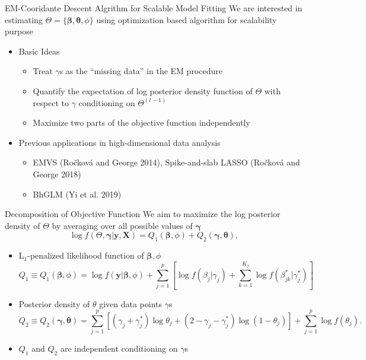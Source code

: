 \documentclass[
  ignorenonframetext,
  aspectratio=169]{beamer}
\providecommand{\tightlist}{%
  \setlength{\itemsep}{0pt}\setlength{\parskip}{0pt}}
\newcommand{\bs}[1]{\boldsymbol{#1}}
\newcommand{\tp}{*}
\begin{document}
\begin{frame}{EM-Cooridante Descent Algrithm for Scalable Model Fitting}
\protect\hypertarget{em-cooridante-descent-algrithm-for-scalable-model-fitting}{}
We are interested in estimating
\(\Theta = \{\bm \beta, \bm \theta, \phi\}\) using optimization based
algorithm for scalability purpose

\begin{itemize}
\tightlist
\item
  Basic Ideas

  \begin{itemize}
  \tightlist
  \item
    Treat \(\gamma\)s as the ``missing data'' in the EM procedure
  \item
    Quantify the expectation of log posterior density function of
    \(\Theta\) with respect to \(\gamma\) conditioning on
    \(\Theta^{(t-1)}\)
  \item
    Maximize two parts of the objective function independently
  \end{itemize}
\item
  Previous applications in high-dimensional data analysis

  \begin{itemize}
  \tightlist
  \item
    EMVS (Ročková and George 2014), Spike-and-slab LASSO (Ročková and
    George 2018)
  \item
    BhGLM (Yi et al. 2019)
  \end{itemize}
\end{itemize}
\end{frame}

\begin{frame}{Decomposition of Objective Function}
\protect\hypertarget{decomposition-of-objective-function}{}
We aim to maximize the log posterior density of \(\Theta\) by averaging
over all possible values of \(\bm \gamma\)
\[ \log f(\Theta, \bs \gamma| \textbf{y}, \textbf{X}) = Q_1(\bs \beta, \phi) + Q_2 (\bs \gamma,\bs \theta),\]

\begin{itemize}
\item
  L\(_1\)-penalized likelihood function of \(\bs \beta, \phi\)
  \[Q_1 \equiv Q_1(\bs \beta, \phi) = \log f(\textbf{y}|\bs \beta, \phi) + \sum\limits_{j=1}^p\left[\log f(\beta_j|\gamma_j)+\sum\limits_{k=1}^{K_j} \log f(\beta^{\tp}_{jk}|\gamma^{\tp}_{j})\right]\]
\item
  Posterior density of \(\theta\) given data points \(\gamma\)s
  \[Q_2 \equiv Q_2(\bs\gamma,\bs\theta) = \sum\limits_{j=1}^{p} \left[ (\gamma_j+\gamma_{j}^{\tp})\log \theta_j + (2-\gamma_j-\gamma_{j}^{\tp}) \log (1-\theta_j)\right] +  \sum\limits_{j=1}^{p}\log f(\theta_j).\]
\item
  \(Q_1\) and \(Q_2\) are independent conditioning on \(\gamma\)s
\end{itemize}
\end{frame}
\end{document}
